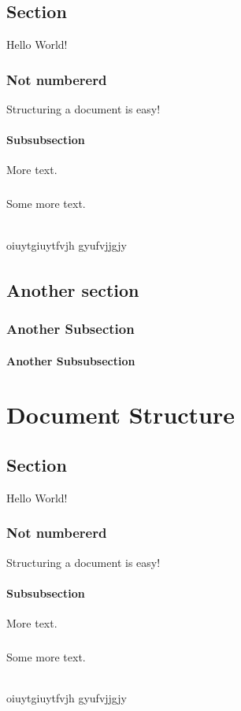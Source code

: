 \documentclass{book}
\begin{document}
	\section{Section}
	Hello World!
	\subsection*{Not numbererd}
	Structuring a document is easy!
	\subsubsection{Subsubsection}
	More text.
	\paragraph{}
	Some more text.
	\subparagraph{}
	oiuytgiuytfvjh gyufvjjgjy
	
	\subparagraph{}
	\lipsum[1]
	\section{Another section}
	\subsection{Another Subsection}
	\subsubsection{Another Subsubsection}
	\lipsum[1-3]\chapter{Document Structure}
	\section{Section}
	Hello World!
	\subsection*{Not numbererd}
	Structuring a document is easy!
	\subsubsection{Subsubsection}
	More text.
	\paragraph{}
	Some more text.
	\subparagraph{}
	oiuytgiuytfvjh gyufvjjgjy
	
\end{document}
